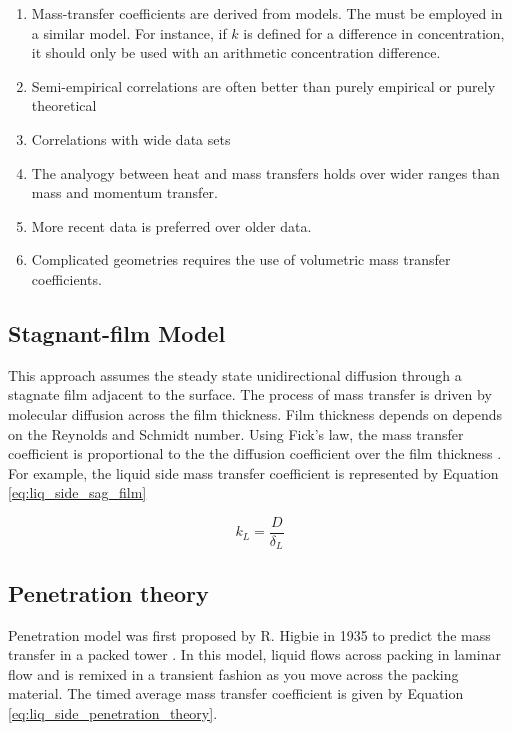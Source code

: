 \begin{enumerate}
	\item Mass-transfer coefficients are derived from models. The must be employed in a similar model. For instance, if $k$ is defined for a difference in concentration, it should only be used with an arithmetic concentration difference. 
	\item Semi-empirical correlations are often better than purely empirical or purely theoretical 
	\item Correlations with wide data sets
	\item The analyogy between heat and mass transfers holds over wider ranges than mass and momentum transfer. 
	\item More recent data is preferred over older data. 
	\item Complicated geometries requires the use of volumetric mass transfer coefficients. 
\end{enumerate}

\subsection{Stagnant-film Model}
This approach assumes the steady state unidirectional diffusion through a stagnate film adjacent to the surface. The process of mass transfer is driven by molecular diffusion across the film thickness. Film thickness depends on depends on the Reynolds and Schmidt number. Using Fick's law, the mass transfer coefficient is proportional to the the diffusion coefficient over the film thickness \cite{perry2007}. For example, the liquid side mass transfer coefficient is represented by Equation \ref{eq:liq_side_sag_film}

\begin{equation}
	k_{L} = \frac{D}{\delta_{L}}
	\label{eq:liq_side_sag_film}
\end{equation}

\subsection{Penetration theory}
Penetration model was first proposed by R. Higbie in 1935 \cite{asano2006} to predict the mass transfer in a packed tower \cite{perry2007}. In this model, liquid flows across packing in laminar flow and is remixed in a transient fashion as you move across the packing material. The timed average mass transfer coefficient is given by Equation \ref{eq:liq_side_penetration_theory}.

